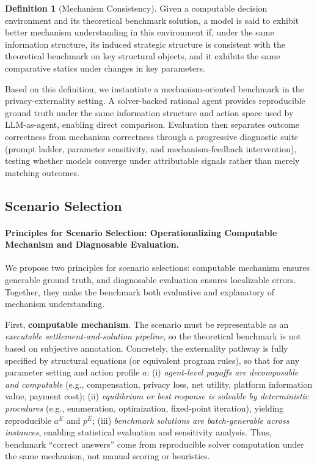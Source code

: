 \documentclass[sigconf,anonymous,review]{acmart}
\theoremstyle{definition}
\newtheorem{definition}{Definition}
\begin{document}
\begin{definition}[Mechanism Consistency]
Given a computable decision environment and its theoretical benchmark solution, a model is said to exhibit better mechanism understanding in this environment if, under the same information structure, its induced strategic structure is consistent with the theoretical benchmark on key structural objects, and it exhibits the same comparative statics under changes in key parameters.
\end{definition}

Based on this definition, we instantiate a mechanism-oriented benchmark in the privacy-externality setting. A solver-backed rational agent provides reproducible ground truth under the same information structure and action space used by LLM-as-agent, enabling direct comparison. Evaluation then separates outcome correctness from mechanism correctness through a progressive diagnostic suite (prompt ladder, parameter sensitivity, and mechanism-feedback intervention), testing whether models converge under attributable signals rather than merely matching outcomes.


 \subsection{Scenario Selection}
\label{subsec:scenario_selection}

\paragraph{\textbf{Principles for Scenario Selection: Operationalizing Computable Mechanism and Diagnosable Evaluation.}}
We propose two principles for scenario selections: computable mechanism ensures generable ground truth, and diagnosable evaluation ensures localizable errors. Together, they make the benchmark both evaluative and explanatory of mechanism understanding.

First, \textbf{computable mechanism}. The scenario must be representable as an \emph{executable settlement-and-solution pipeline}, so the theoretical benchmark is not based on subjective annotation. Concretely, the externality pathway is fully specified by structural equations (or equivalent program rules), so that for any parameter setting and action profile \(a\):  
(i) \emph{agent-level payoffs are decomposable and computable} (e.g., compensation, privacy loss, net utility, platform information value, payment cost);  
(ii) \emph{equilibrium or best response is solvable by deterministic procedures} (e.g., enumeration, optimization, fixed-point iteration), yielding reproducible \(a^E\) and \(p^E\);  
(iii) \emph{benchmark solutions are batch-generable across instances}, enabling statistical evaluation and sensitivity analysis.  
Thus, benchmark ``correct answers'' come from reproducible solver computation under the same mechanism, not manual scoring or heuristics.
\end{document}
